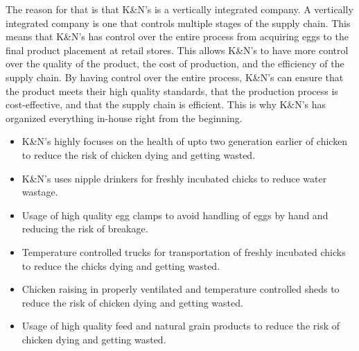 \documentclass[a4paper]{exam}
\begin{document}
    \begin{questions}
        \begin{solution}
            The reason for that is that K\&N's is a vertically integrated company. A vertically integrated company is one that controls multiple stages of the supply chain. This means that K\&N's has control over the entire process from acquiring eggs to the final product placement at retail stores. This allows K\&N's to have more control over the quality of the product, the cost of production, and the efficiency of the supply chain. By having control over the entire process, K\&N's can ensure that the product meets their high quality standards, that the production process is cost-effective, and that the supply chain is efficient. This is why K\&N's has organized everything in-house right from the beginning.
        \end{solution}

        \begin{solution}
            \begin{itemize}
                \item K\&N's highly focuses on the health of upto two generation earlier of chicken to reduce the risk of chicken dying and getting wasted.
                \item K\&N's uses nipple drinkers for freshly incubated chicks to reduce water wastage.
                \item Usage of high quality egg clamps to avoid handling of eggs by hand and reducing the risk of breakage.
                \item Temperature controlled trucks for transportation of freshly incubated chicks to reduce the chicks dying and getting wasted.
                \item Chicken raising in properly ventilated and temperature controlled sheds to reduce the risk of chicken dying and getting wasted.
                \item Usage of high quality feed and natural grain products to reduce the risk of chicken dying and getting wasted.
            \end{itemize}
        \end{solution}


\end{questions}
\end{document}
